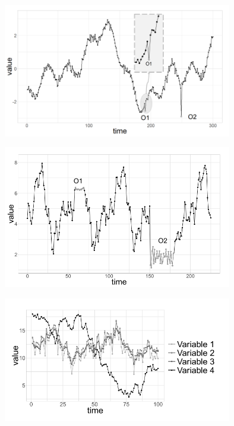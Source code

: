 \begin{figure}[H]
    \centering
    \includegraphics[width=10cm]{Cap2_LitReview/point_anomaly.png}
    \caption{\cite{Blazquez-Garcia_Conde_Mori_Lozano_2021}}
    \label{fig:point_anomaly}
\end{figure}

\begin{figure}[H]
    \centering
    \includegraphics[width=10cm]{Cap2_LitReview/subseq_anomaly.png}
    \caption{\cite{Blazquez-Garcia_Conde_Mori_Lozano_2021}}
    \label{fig:subsequence_anomaly}
\end{figure}

\begin{figure}[H]
    \centering
    \includegraphics[width=10cm]{Cap2_LitReview/TS_anomaly.png}
    \caption{\cite{Blazquez-Garcia_Conde_Mori_Lozano_2021}}
    \label{fig:Time_series_anomaly}
\end{figure}

